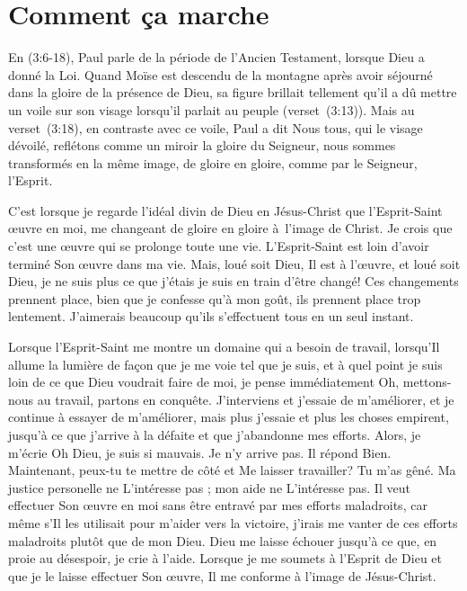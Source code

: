 \section{Comment \c{c}a marche}

En (3:6-18), Paul parle de la période
 de l'Ancien Testament, lorsque Dieu a donné la Loi.
 Quand Moïse est descendu de la montagne après avoir séjourné
 dans la gloire de la présence de Dieu,
 sa figure brillait tellement qu'il a dû mettre un voile sur son visage
 lorsqu'il parlait au peuple (verset~(3:13)).
 Mais au verset~(3:18), en contraste avec ce voile,
 Paul a dit\frcolon{}
 \Og Nous tous, qui le visage dévoilé, reflétons comme un miroir
 la gloire du Seigneur, nous sommes transformés en la même image,
 de gloire en gloire, comme par le Seigneur,
 l'Esprit. \Fg{}

C'est lorsque je regarde l'idéal divin de Dieu en Jésus-Christ
 que l'Esprit-Saint œuvre en moi, me changeant de gloire en gloire
 à~l'image de Christ.
 Je crois que c'est une œuvre qui se prolonge toute une vie.
 L'Es\-prit-Saint est loin d'avoir terminé Son œuvre dans ma vie.
 Mais, loué soit Dieu, Il est à l'œuvre, et loué soit Dieu,
 je ne suis plus ce que j'étais
 \ocadr je suis en train d'être changé!
 Ces changements prennent place, bien que je confesse qu'à mon goût, ils prennent place
 trop lentement.
 J'aimerais beaucoup qu'ils s'effectuent tous en un seul instant.

Lorsque l'Esprit-Saint me montre un domaine qui a besoin de travail,
 lorsqu'Il allume la lumière de façon que je me voie tel que je suis,
 et à quel point je suis loin de ce que Dieu voudrait faire de moi,
 je pense immédiatement\frcolon{}
 \Og Oh, mettons-nous au travail, partons en conquête. \Fg{}
 J'interviens et j'essaie de m'améliorer,
 et je continue à essayer de m'améliorer,
 mais plus j'essaie et plus les choses empirent,
 jusqu'à ce que j'arrive à la défaite et que j'abandonne mes efforts.
 Alors, je m'écrie\frcolon{}
 \Og Oh Dieu, je suis si mauvais. Je n'y arrive pas. \Fg{}
 Il répond\frcolon{}
 \Og Bien. Maintenant, peux-tu te mettre de côté et Me laisser travailler?
 Tu m'as gêné. \Fg{}
 Ma justice personelle ne L'intéresse pas ;
 mon aide ne L'intéresse pas.
 Il veut effectuer Son œuvre en moi sans être entravé
 par mes efforts maladroits,
 car même s'Il les utilisait
 pour m'aider vers la victoire,
 j'irais me vanter de ces efforts maladroits plutôt que de mon Dieu.
 Dieu me laisse échouer jusqu'à ce que, en proie au désespoir, je crie à l'aide.
 Lorsque je me soumets à l'Esprit de Dieu et que je le laisse
 effectuer Son œuvre, Il me conforme à l'image de Jésus-Christ.


